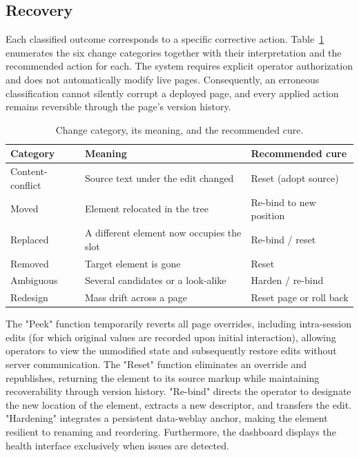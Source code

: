 \documentclass[conference]{IEEEtran}
\begin{document}
\subsection{Recovery}\label{sec:recovery}
Each classified outcome corresponds to a specific corrective action. Table~\ref{tab:cures} enumerates the six change categories together with their interpretation and the recommended action for each. The system requires explicit operator authorization and does not automatically modify live pages. Consequently, an erroneous classification cannot silently corrupt a deployed page, and every applied action remains reversible through the page's version history.

\begin{table}[t]
\caption{Change category, its meaning, and the recommended cure.}
\label{tab:cures}
\centering
\footnotesize
\begin{tabular}{@{}p{1.5cm}p{3.0cm}p{2.3cm}@{}}
\toprule
\textbf{Category} & \textbf{Meaning} & \textbf{Recommended cure} \\
\midrule
Content-conflict & Source text under the edit changed & Reset (adopt source) \\
Moved & Element relocated in the tree & Re-bind to new position \\
Replaced & A different element now occupies the slot & Re-bind / reset \\
Removed & Target element is gone & Reset \\
Ambiguous & Several candidates or a look-alike & Harden / re-bind \\
Redesign & Mass drift across a page & Reset page or roll back \\
\bottomrule
\end{tabular}
\end{table}

The "Peek" function temporarily reverts all page overrides, including intra-session edits (for which original values are recorded upon initial interaction), allowing operators to view the unmodified state and subsequently restore edits without server communication. The "Reset" function eliminates an override and republishes, returning the element to its source markup while maintaining recoverability through version history. "Re-bind" directs the operator to designate the new location of the element, extracts a new descriptor, and transfers the edit. "Hardening" integrates a persistent data-weblay anchor, making the element resilient to renaming and reordering. Furthermore, the dashboard displays the health interface exclusively when issues are detected.
\end{document}

